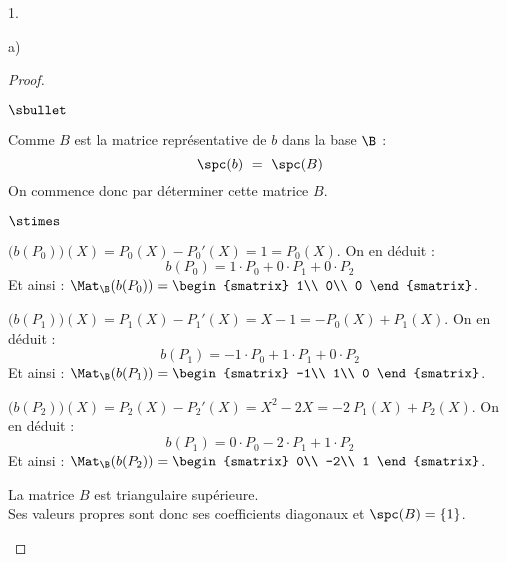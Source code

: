 \documentclass[11pt]{article}%
\begin{document}
\begin{noliste}{1.}
\begin{noliste}{a)}
    \begin{proof}~
      \begin{noliste}{$\sbullet$}
      \item Comme $B$ est la matrice représentative de $b$ dans la
        base $\B$ :
        \[
        \spc(b) \ = \ \spc(B)
        \]
        On commence donc par déterminer cette matrice $B$.
        \begin{noliste}{$\stimes$}
	\item $\big( b(P_0) \big) (X) = P_0(X) - P_0'(X) = 1 =
          P_0(X)$. On en déduit :
          \[
          b(P_0) = 1 \cdot P_0 + 0 \cdot P_1 + 0 \cdot P_2
          \]
          Et ainsi : $\Mat_{\B}(b(P_0)) =
          \begin{smatrix}
            1\\
            0\\
            0
          \end{smatrix}$.
	
	\item $\big( b(P_1) \big) (X) = P_1(X) - P_1'(X) = X - 1 =
          -P_0(X) + P_1(X)$. On en déduit :
          \[
          b(P_1) = -1 \cdot P_0 + 1 \cdot P_1 + 0 \cdot P_2
          \]
          Et ainsi : $\Mat_{\B}(b(P_1)) =
          \begin{smatrix}
            -1\\
            1\\
            0
          \end{smatrix}$.

	\item $\big( b(P_2) \big) (X) = P_2(X) - P_2'(X) = X^2 - 2X =
          -2 \ P_1(X) + P_2(X)$. On en déduit :
          \[
          b(P_1) = 0 \cdot P_0 - 2 \cdot P_1 + 1 \cdot P_2
          \]
          Et ainsi : $\Mat_{\B}(b(P_2)) =
          \begin{smatrix}
            0\\
            -2\\
            1
          \end{smatrix}$.
	\end{noliste}

      \item La matrice $B$ est triangulaire supérieure.\\
        Ses valeurs propres sont donc ses coefficients diagonaux et
        $\spc(B) = \{ 1 \}$.%
	~\\[-1cm]
      \end{noliste}
    \end{proof}
    

\end{noliste}
\end{noliste}
\end{document}
